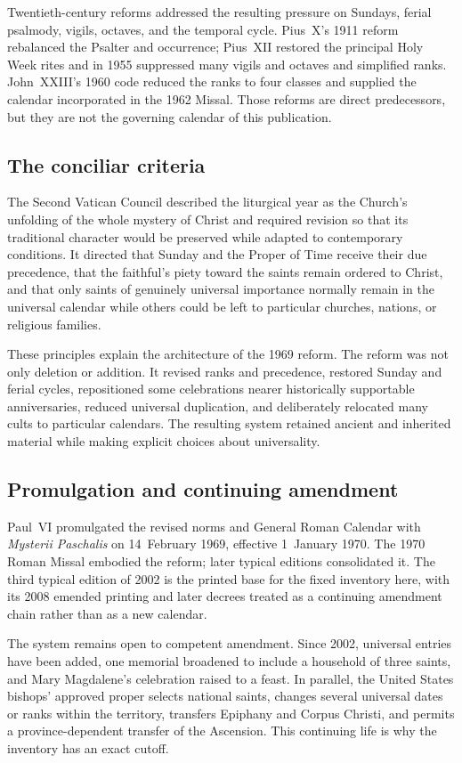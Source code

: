 Twentieth-century reforms addressed the resulting pressure on Sundays, ferial psalmody, vigils, octaves, and the temporal cycle. Pius~X's 1911 reform rebalanced the Psalter and occurrence; Pius~XII restored the principal Holy Week rites and in 1955 suppressed many vigils and octaves and simplified ranks. John~XXIII's 1960 code reduced the ranks to four classes and supplied the calendar incorporated in the 1962 Missal. Those reforms are direct predecessors, but they are not the governing calendar of this publication.

\subsection{The conciliar criteria}

The Second Vatican Council described the liturgical year as the Church's unfolding of the whole mystery of Christ and required revision so that its traditional character would be preserved while adapted to contemporary conditions. It directed that Sunday and the Proper of Time receive their due precedence, that the faithful's piety toward the saints remain ordered to Christ, and that only saints of genuinely universal importance normally remain in the universal calendar while others could be left to particular churches, nations, or religious families.

These principles explain the architecture of the 1969 reform. The reform was not only deletion or addition. It revised ranks and precedence, restored Sunday and ferial cycles, repositioned some celebrations nearer historically supportable anniversaries, reduced universal duplication, and deliberately relocated many cults to particular calendars. The resulting system retained ancient and inherited material while making explicit choices about universality.

\subsection{Promulgation and continuing amendment}

Paul~VI promulgated the revised norms and General Roman Calendar with \emph{Mysterii Paschalis} on 14~February 1969, effective 1~January 1970. The 1970 Roman Missal embodied the reform; later typical editions consolidated it. The third typical edition of 2002 is the printed base for the fixed inventory here, with its 2008 emended printing and later decrees treated as a continuing amendment chain rather than as a new calendar.

The system remains open to competent amendment. Since 2002, universal entries have been added, one memorial broadened to include a household of three saints, and Mary Magdalene's celebration raised to a feast. In parallel, the United States bishops' approved proper selects national saints, changes several universal dates or ranks within the territory, transfers Epiphany and Corpus Christi, and permits a province-dependent transfer of the Ascension. This continuing life is why the inventory has an exact cutoff.
